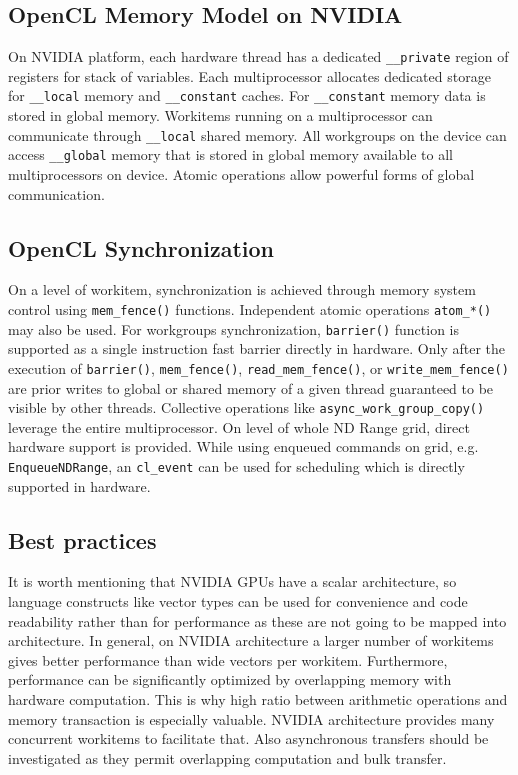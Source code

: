 \subsection{OpenCL Memory Model on NVIDIA}
On NVIDIA platform, each hardware thread has a dedicated \texttt{\_\_private} region of registers for stack of variables. Each multiprocessor allocates dedicated storage for \texttt{\_\_local} memory and \texttt{\_\_constant} caches. For \texttt{\_\_constant} memory data is stored in global memory. Workitems running on a multiprocessor can communicate through \texttt{\_\_local} shared memory. All workgroups on the device can access \texttt{\_\_global} memory that is stored in global memory available to all multiprocessors on device. Atomic operations allow powerful forms of global communication.

\subsection{OpenCL Synchronization}
On a level of workitem, synchronization is achieved through memory system control using \texttt{mem\_fence()} functions. Independent atomic operations \texttt{atom\_*()} may also be used. For workgroups synchronization, \texttt{barrier()} function is supported as a single instruction fast barrier directly in hardware. Only after the execution of \texttt{barrier()}, \texttt{mem\_fence()}, \texttt{read\_mem\_fence()}, or \texttt{write\_mem\_fence()} are prior writes to global or shared memory of a given thread guaranteed to be visible by other threads. Collective operations like \texttt{async\_work\_group\_copy()} leverage the entire multiprocessor. On level of whole ND Range grid, direct hardware support is provided. While using enqueued commands on grid, e.g. \texttt{EnqueueNDRange}, an \texttt{cl\_event} can be used for scheduling which is directly supported in hardware.

\subsection{Best practices}
It is worth mentioning that NVIDIA GPUs have a scalar architecture, so language constructs like vector types can be used for convenience and code readability rather than for performance as these are not going to be mapped into architecture. In general, on NVIDIA architecture a larger number of workitems gives better performance than wide vectors per workitem. Furthermore, performance can be significantly optimized by overlapping memory with hardware computation. This is why high ratio between arithmetic operations and memory transaction is especially valuable. NVIDIA architecture provides many concurrent workitems to facilitate that. Also asynchronous transfers should be investigated as they permit overlapping computation and bulk transfer.

